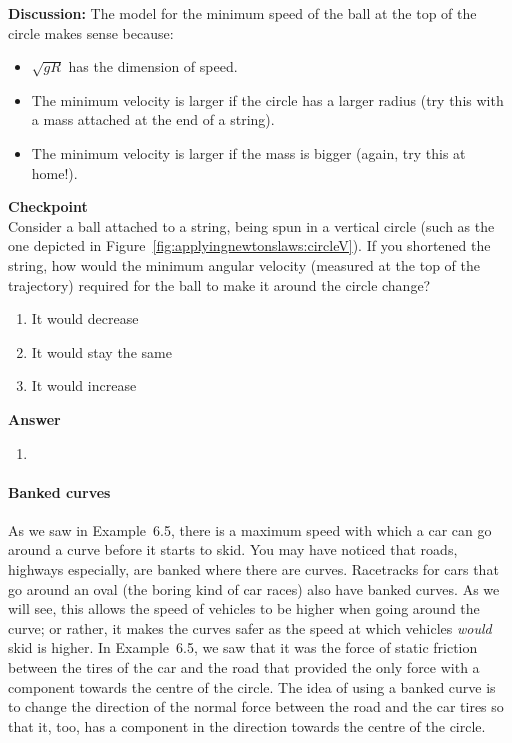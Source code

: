 \begin{framed}
\begin{framed}
\textbf{Discussion:} The model for the minimum speed of the ball at the top of the circle makes sense because:

\begin{itemize}
\item $\sqrt{gR}$ has the dimension of speed.
\item The minimum velocity is larger if the circle has a larger radius (try this with a mass attached at the end of a string).
\item The minimum velocity is larger if the mass is bigger (again, try this at home!).
\end{itemize}
\end{framed}
\end{framed}

\begin{framed}
\textbf{Checkpoint}\\
Consider a ball attached to a string, being spun in a vertical circle (such as the one depicted in Figure~\ref{fig:applyingnewtonslaws:circleV}). If you shortened the string, how would the minimum angular velocity (measured at the top of the trajectory) required for the ball to make it around the circle change?

\begin{enumerate}
\item It would decrease
\item It would stay the same
\item It would increase
\end{enumerate}

\begin{framed}
\textbf{Answer}\\
\begin{enumerate}
\item
\end{enumerate}
\end{framed}
\end{framed}

\paragraph{Banked curves}

As we saw in Example~6.5, there is a maximum speed with which a car can go around a curve before it starts to skid. You may have noticed that roads, highways especially, are banked where there are curves. Racetracks for cars that go around an oval (the boring kind of car races) also have banked curves. As we will see, this allows the speed of vehicles to be higher when going around the curve; or rather, it makes the curves safer as the speed at which vehicles \textit{would} skid is higher. In Example~6.5, we saw that it was the force of static friction between the tires of the car and the road that provided the only force with a component towards the centre of the circle. The idea of using a banked curve is to change the direction of the normal force between the road and the car tires so that it, too, has a component in the direction towards the centre of the circle.

